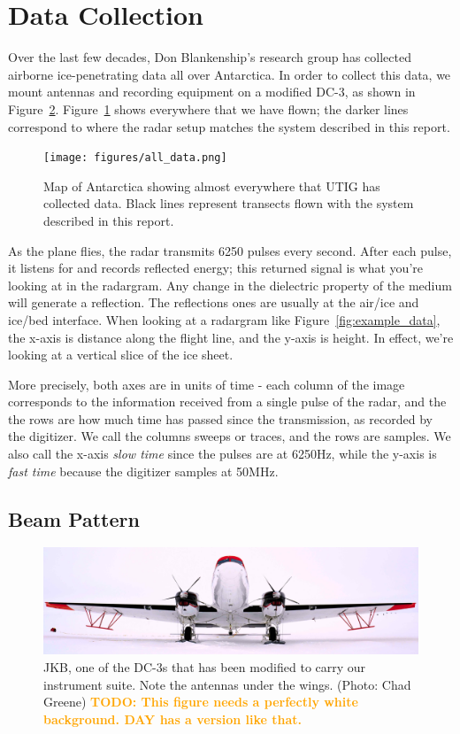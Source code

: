 \documentclass[11pt]{article}
\newcommand{\future}[1]{\ifthenelse{\boolean{include-future}} {\textcolor{Orange}{\textbf{TODO: #1}}}{}}
\newcommand{\figref}[1]{Figure~\ref{#1}}
\begin{document}
\section{Data Collection}

Over the last few decades, Don Blankenship's research group has collected airborne ice-penetrating data all over Antarctica. In order to collect this data, we mount antennas and recording equipment on a modified DC-3, as shown in \figref{fig:JKB_chad}. \figref{fig:all_data} shows everywhere that we have flown; the darker lines correspond to where the radar setup matches the system described in this report. 

\begin{figure}[ht!]
\centering
\texttt{[image: figures/all\_data.png]}
\caption[]{Map of Antarctica showing almost everywhere that UTIG has collected data. Black lines represent transects flown with the system described in this report.}
\label{fig:all_data}
\end{figure}

As the plane flies, the radar transmits 6250 pulses every second.
After each pulse, it listens for and records reflected energy; this returned signal is what you're looking at in the radargram.
Any change in the dielectric property of the medium will generate a reflection. The reflections ones are usually at the air/ice and ice/bed interface. 
When looking at a radargram like \figref{fig:example_data}, the x-axis is distance along the flight line, and the y-axis is height. In effect, we're looking at a vertical slice of the ice sheet.

More precisely, both axes are in units of time - each column of the image corresponds to the information received from a single pulse of the radar, and the the rows are how much time has passed since the transmission, as recorded by the digitizer. We call the columns sweeps or traces, and the rows are samples. We also call the x-axis \emph{slow time} since the pulses are at 6250Hz, while the y-axis is \emph{fast time} because the digitizer samples at 50MHz.

\subsection{Beam Pattern}
\label{sec:beam_pattern}

\begin{figure}[ht!]
\centering
\includegraphics[width=0.95\columnwidth]{figures/JKB_chad_smaller.jpg}
\caption[]{JKB, one of the DC-3s that has been modified to carry our instrument suite. Note the antennas under the wings. (Photo: Chad Greene) \future{This figure needs a perfectly white background. DAY has a version like that.}}
\label{fig:JKB_chad}
\end{figure}
\end{document}
